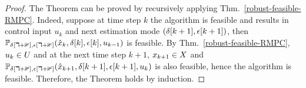 \begin{proof}
The Theorem can be proved by recursively applying Thm.~\ref{robust-feasible-RMPC}.
Indeed, suppose at time step $k$ the algorithm
is feasible and results in control input $u_{k}$ and next estimation
mode $\left(\delta[k+1],\epsilon[k+1]\right)$, then $\mathbb{P_{\delta[k+1],\epsilon[k+1]}}(\hat{x}_{k},\delta[k],\epsilon[k],u_{k-1})$
is feasible. By Thm.~\ref{robust-feasible-RMPC}, $u_{k}\in U$ and
at the next time step $k+1$, $x_{k+1}\in X$ and $\mathbb{P_{\delta[k+1],\epsilon[k+1]}}(\hat{x}_{k+1},\delta[k+1],\epsilon[k+1],u_{k})$
is also feasible, hence the algorithm is feasible.
Therefore, the Theorem holds by induction.
\end{proof}


